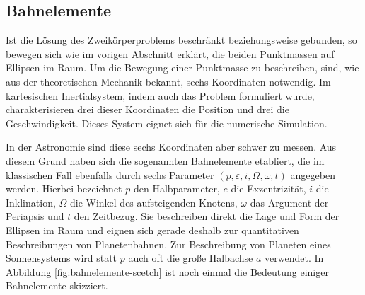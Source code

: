 
  \subsection{Bahnelemente} %
  \label{sub:bahnelemente}

    Ist die Lösung des Zweikörperproblems beschränkt beziehungsweise gebunden, so bewegen sich wie im vorigen Abschnitt erklärt, die beiden Punktmassen auf Ellipsen im Raum.
    Um die Bewegung einer Punktmasse zu beschreiben, sind, wie aus der theoretischen Mechanik bekannt, sechs Koordinaten notwendig.
    Im kartesischen Inertialsystem, indem auch das Problem formuliert wurde, charakterisieren drei dieser Koordinaten die Position und drei die Geschwindigkeit.
    Dieses System eignet sich für die numerische Simulation.

    In der Astronomie sind diese sechs Koordinaten aber schwer zu messen.
    Aus diesem Grund haben sich die sogenannten Bahnelemente etabliert, die im klassischen Fall ebenfalls durch sechs Parameter $(p,\varepsilon,i,\Omega,\omega,t)$ angegeben werden.
    Hierbei bezeichnet $p$ den Halbparameter, $e$ die Exzentrizität, $i$ die Inklination, $\Omega$ die Winkel des aufsteigenden Knotens, $\omega$ das Argument der Periapsis und $t$ den Zeitbezug.
    Sie beschreiben direkt die Lage und Form der Ellipsen im Raum und eignen sich gerade deshalb zur quantitativen Beschreibungen von Planetenbahnen.
    Zur Beschreibung von Planeten eines Sonnensystems wird statt $p$ auch oft die große Halbachse $a$ verwendet.
    In Abbildung \ref{fig:bahnelemente-scetch} ist noch einmal die Bedeutung einiger Bahnelemente skizziert.

